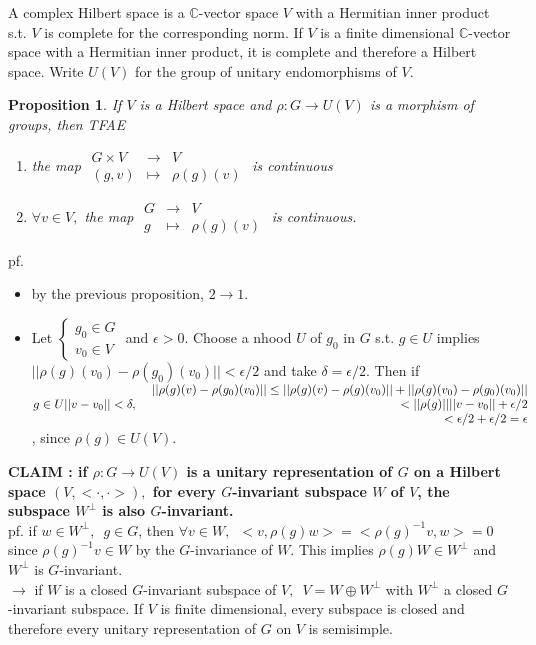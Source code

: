 \documentclass[12pt,letterpaper]{report}
\newtheorem{proposition}{Proposition}[section]
\begin{document}
A complex Hilbert space is a $\mathbb{C}$-vector space $V$ with a Hermitian inner product s.t. $V$ is complete for the corresponding norm. If $V$ is a finite dimensional $\mathbb{C}$-vector space with a Hermitian inner product, it is complete and therefore a Hilbert space. Write $U(V)$ for the group of unitary endomorphisms of $V$. 
\begin{proposition}If $V$ is a Hilbert space and $\rho:G\rightarrow U(V)$ is a morphism of groups, then TFAE\begin{enumerate}\item the map $\begin{array}{rrr}G\times V&\rightarrow&V\\(g,v)&\mapsto&\rho(g)(v)\end{array}$ is continuous\item $\forall v\in V,$ the map $\begin{array}{rrr}G&\rightarrow&V\\g&\mapsto &\rho(g)(v)\end{array}$ is continuous.\end{enumerate}\end{proposition}
pf. \begin{itemize}\item by the previous proposition, $2\rightarrow 1$.
\item Let $\left\{\begin{array}{r}g_{0}\in G\\v_{0}\in V\end{array}\right.$ and $\epsilon>0$. Choose a nhood $U$ of $g_{0}$ in $G$ s.t. $g\in U$ implies $||\rho(g)(v_{0})-\rho(g_{0})(v_{0})||<\epsilon/2$ and take $\delta=\epsilon/2$. Then if $g\in U\\||v-v_{0}||<\delta,\,\,\,\,\begin{array}{r}||\rho(g)(v)-\rho(g_{0})(v_{0})||\leq||\rho(g)(v)-\rho(g)(v_{0})||+||\rho(g)(v_{0})-\rho(g_{0})(v_{0})||\\<||\rho(g)||||v-v_{0}||+\epsilon/2\\<\epsilon/2+\epsilon/2=\epsilon\end{array}$, since $\rho(g)\in U(V)$.
\end{itemize}

\textbf{CLAIM : if $\rho:G\rightarrow U(V)$ is a unitary representation of $G$ on a Hilbert space $(V,<\cdot,\cdot>),$ for every $G$-invariant subspace $W$ of $V$, the subspace $W^{\perp}$ is also $G$-invariant.}
\\pf. if $w\in W^{\perp},\,\,\,g\in G$, then $\forall v\in W,\,\,\,<v,\rho(g)w>=<\rho(g)^{-1}v,w>=0$ since $\rho(g)^{-1}v\in W$ by the $G$-invariance of $W$. This implies $\rho(g)W\in W^{\perp}$ and $W^{\perp}$ is $G$-invariant. 
\\$\rightarrow $ if $W$ is a closed $G$-invariant subspace of $V,\,\,\,V=W\oplus W^{\perp}$ with $W^{\perp}$ a closed $G$-invariant subspace. If $V$ is finite dimensional, every subspace is closed and therefore every unitary representation of $G$ on $V$ is semisimple. 
\end{document}
